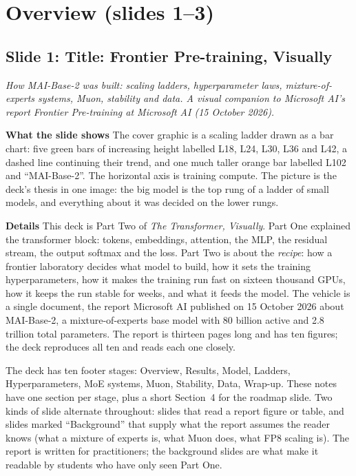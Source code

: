 \documentclass[11pt,letterpaper]{article}
\newcommand{\setstage}[1]{\colorlet{stagec}{#1}}
\newcommand{\slide}[3]{%
  \subsection[Slide #1: #2]{Slide #1: #2}%
  {\color{muted}\itshape #3\par}\medskip}
\newcommand{\para}[1]{\medskip\noindent\textbf{#1}\quad}
\begin{document}
\setstage{ink}
\section{Overview (slides 1--3)}

\slide{1}{Title: Frontier Pre-training, Visually}{How MAI-Base-2 was built: scaling ladders, hyperparameter laws, mixture-of-experts systems, Muon, stability and data. A visual companion to Microsoft AI's report \emph{Frontier Pre-training at Microsoft AI} (15 October 2026).}

\para{What the slide shows} The cover graphic is a scaling ladder drawn as a bar chart: five green bars of increasing height labelled L18, L24, L30, L36 and L42, a dashed line continuing their trend, and one much taller orange bar labelled L102 and ``MAI-Base-2''. The horizontal axis is training compute. The picture is the deck's thesis in one image: the big model is the top rung of a ladder of small models, and everything about it was decided on the lower rungs.

\para{Details} This deck is Part Two of \emph{The Transformer, Visually}. Part One explained the transformer block: tokens, embeddings, attention, the MLP, the residual stream, the output softmax and the loss. Part Two is about the \emph{recipe}: how a frontier laboratory decides what model to build, how it sets the training hyperparameters, how it makes the training run fast on sixteen thousand GPUs, how it keeps the run stable for weeks, and what it feeds the model. The vehicle is a single document, the report Microsoft AI published on 15 October 2026 about MAI-Base-2, a mixture-of-experts base model with 80 billion active and 2.8 trillion total parameters. The report is thirteen pages long and has ten figures; the deck reproduces all ten and reads each one closely.

The deck has ten footer stages: Overview, Results, Model, Ladders, Hyperparameters, MoE systems, Muon, Stability, Data, Wrap-up. These notes have one section per stage, plus a short Section~4 for the roadmap slide. Two kinds of slide alternate throughout: slides that read a report figure or table, and slides marked ``Background'' that supply what the report assumes the reader knows (what a mixture of experts is, what Muon does, what FP8 scaling is). The report is written for practitioners; the background slides are what make it readable by students who have only seen Part One.
\end{document}
